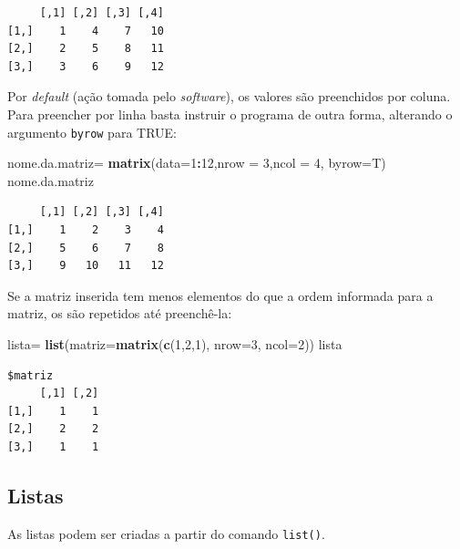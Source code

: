 \documentclass[12pt,brazil,]{book}
\newenvironment{Shaded}{\begin{snugshade}}{\end{snugshade}}
\newcommand{\DataTypeTok}[1]{\textcolor[rgb]{0.13,0.29,0.53}{#1}}
\newcommand{\DecValTok}[1]{\textcolor[rgb]{0.00,0.00,0.81}{#1}}
\newcommand{\KeywordTok}[1]{\textcolor[rgb]{0.13,0.29,0.53}{\textbf{#1}}}
\newcommand{\NormalTok}[1]{#1}
\newcommand{\OperatorTok}[1]{\textcolor[rgb]{0.81,0.36,0.00}{\textbf{#1}}}
\newcommand{\StringTok}[1]{\textcolor[rgb]{0.31,0.60,0.02}{#1}}
\begin{document}
\begin{verbatim}
     [,1] [,2] [,3] [,4]
[1,]    1    4    7   10
[2,]    2    5    8   11
[3,]    3    6    9   12
\end{verbatim}

Por \emph{default} (ação tomada pelo \emph{software}), os valores são
preenchidos por coluna. Para preencher por linha basta instruir o
programa de outra forma, alterando o argumento \texttt{byrow} para TRUE:

\begin{Shaded}
\begin{Highlighting}[]
\NormalTok{nome.da.matriz=}\StringTok{ }\KeywordTok{matrix}\NormalTok{(}\DataTypeTok{data=}\DecValTok{1}\OperatorTok{:}\DecValTok{12}\NormalTok{,}\DataTypeTok{nrow =} \DecValTok{3}\NormalTok{,}\DataTypeTok{ncol =} \DecValTok{4}\NormalTok{, }\DataTypeTok{byrow=}\NormalTok{T)}
\NormalTok{nome.da.matriz}
\end{Highlighting}
\end{Shaded}

\begin{verbatim}
     [,1] [,2] [,3] [,4]
[1,]    1    2    3    4
[2,]    5    6    7    8
[3,]    9   10   11   12
\end{verbatim}

Se a matriz inserida tem menos elementos do que a ordem informada para a
matriz, os são repetidos até preenchê-la:

\begin{Shaded}
\begin{Highlighting}[]
\NormalTok{lista=}\StringTok{ }\KeywordTok{list}\NormalTok{(}\DataTypeTok{matriz=}\KeywordTok{matrix}\NormalTok{(}\KeywordTok{c}\NormalTok{(}\DecValTok{1}\NormalTok{,}\DecValTok{2}\NormalTok{,}\DecValTok{1}\NormalTok{), }\DataTypeTok{nrow=}\DecValTok{3}\NormalTok{, }\DataTypeTok{ncol=}\DecValTok{2}\NormalTok{))}
\NormalTok{lista}
\end{Highlighting}
\end{Shaded}

\begin{verbatim}
$matriz
     [,1] [,2]
[1,]    1    1
[2,]    2    2
[3,]    1    1
\end{verbatim}

\hypertarget{listas}{%
\subsection{Listas}\label{listas}}

As listas podem ser criadas a partir do comando \texttt{list()}.
\end{document}
